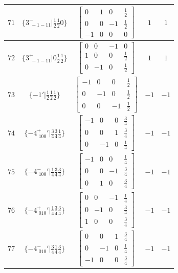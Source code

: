 \documentclass[fleqn,8pt]{jsarticle}
\begin{document}
\begin{longtable}{ccccc}
$ 71 $ & $ \{3^{-}_{\,\,-1-11}|\frac{1}{2} \frac{1}{2} 0\} $ & $ \begin{bmatrix} 0 & 1 & 0 & \frac{1}{2} \\ 0 & 0 & -1 & \frac{1}{2} \\ -1 & 0 & 0 & 0 \end{bmatrix} $ & $ 1 $ & $ 1 $ \\ \hline
$ 72 $ & $ \{3^{+}_{\,\,-1-11}|0 \frac{1}{2} \frac{1}{2}\} $ & $ \begin{bmatrix} 0 & 0 & -1 & 0 \\ 1 & 0 & 0 & \frac{1}{2} \\ 0 & -1 & 0 & \frac{1}{2} \end{bmatrix} $ & $ 1 $ & $ 1 $ \\ \hline
$ 73 $ & $ \{-1{}'|\frac{1}{2} \frac{1}{2} \frac{1}{2}\} $ & $ \begin{bmatrix} -1 & 0 & 0 & \frac{1}{2} \\ 0 & -1 & 0 & \frac{1}{2} \\ 0 & 0 & -1 & \frac{1}{2} \end{bmatrix} $ & $ -1 $ & $ -1 $ \\ \hline
$ 74 $ & $ \{-4^{+}_{\,\,100}{}'|\frac{3}{4} \frac{3}{4} \frac{1}{4}\} $ & $ \begin{bmatrix} -1 & 0 & 0 & \frac{3}{4} \\ 0 & 0 & 1 & \frac{3}{4} \\ 0 & -1 & 0 & \frac{1}{4} \end{bmatrix} $ & $ -1 $ & $ -1 $ \\ \hline
$ 75 $ & $ \{-4^{-}_{\,\,100}{}'|\frac{1}{4} \frac{3}{4} \frac{3}{4}\} $ & $ \begin{bmatrix} -1 & 0 & 0 & \frac{1}{4} \\ 0 & 0 & -1 & \frac{3}{4} \\ 0 & 1 & 0 & \frac{3}{4} \end{bmatrix} $ & $ -1 $ & $ -1 $ \\ \hline
$ 76 $ & $ \{-4^{+}_{\,\,010}{}'|\frac{1}{4} \frac{3}{4} \frac{3}{4}\} $ & $ \begin{bmatrix} 0 & 0 & -1 & \frac{1}{4} \\ 0 & -1 & 0 & \frac{3}{4} \\ 1 & 0 & 0 & \frac{3}{4} \end{bmatrix} $ & $ -1 $ & $ -1 $ \\ \hline
$ 77 $ & $ \{-4^{-}_{\,\,010}{}'|\frac{3}{4} \frac{1}{4} \frac{3}{4}\} $ & $ \begin{bmatrix} 0 & 0 & 1 & \frac{3}{4} \\ 0 & -1 & 0 & \frac{1}{4} \\ -1 & 0 & 0 & \frac{3}{4} \end{bmatrix} $ & $ -1 $ & $ -1 $ \\ \hline

\end{longtable}
\end{document}
